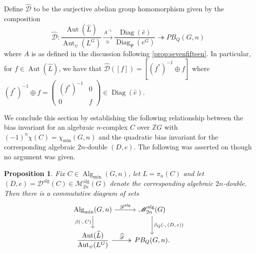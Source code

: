 \documentclass[11pt,a4paper,leqno]{amsart}
\newtheorem{proposition}[theorem]{Proposition}
\theoremstyle{definition}
\theoremstyle{remark}
\newcommand{\wh}{\widehat}
\newcommand{\Z}{\mathbb{Z}}
\DeclareMathOperator{\Aut}{Aut}
\DeclareMathOperator{\DiagIsom}{Diag}
\DeclareMathOperator{\Alg}{Alg}
\DeclareMathOperator{\alg}{alg}
\renewcommand{\L}{L}
\newcommand{\Malg}{\mathscr{M}^{\alg}}
\newcommand{\dalg}{\mathscr{D}^{\alg}}
\begin{document}
Define $\wh{\mathscr{D}}$ to be the surjective abelian group homomorphism given by the composition
\[ \wh{\mathscr{D}} \colon \frac{\Aut(\wh \L)}{\Aut_{\psi}(\L^G)} \xrightarrow[\cong]{A^{-1}} \frac{\DiagIsom(\wh e)}{\DiagIsom_{\Psi}(e^G)}   \twoheadrightarrow PB_Q(G,n) \]	
where $A$ is as defined in the discussion following \cref{prop:sevenfifteen}.
In particular, for $f \in \Aut(\wh L)$, we have that $\wh{\mathscr{D}}([f]) = [(f^*)^{-1} \oplus f]$ where $(f^*)^{-1} \oplus f = \left(\begin{smallmatrix} (f^*)^{-1} & 0 \\ 0 & f \end{smallmatrix}\right) \in \DiagIsom(\wh e)$.

We conclude this section by establishing the following relationship between the bias invariant for an algebraic $n$-complex $C$ over $\Z G$ with $(-1)^n\chi(C) = \chi_{\min}(G,n)$ and the quadratic bias invariant for the corresponding algebraic $2n$-double $(D,e)$.
The following was asserted on \cite[p34]{Kreck:1984} though no argument was given.

\begin{proposition}
\label{prop:bias-vs-qbias}	
Fix $C \in \Alg_{\min}(G,n)$, let $L = \pi_n(C)$ and let $(D,e) = \dalg(C) \in \Malg_{2n}(G)$ denote the corresponding algebraic $2n$-double. Then there is a commutative diagram of sets
\[
\begin{tikzcd}
\Alg_{\min}(G,n) \ar[r,"\mathscr{D}^{\alg}"] \ar[d,"\text{$\beta(\cdot,C)$}"'] & \Malg_{2n}(G)
 \ar[d,"\text{$\beta_Q(\cdot, (D,e))$}"] \\
\displaystyle \frac{\Aut(\wh \L)}{\Aut_{\psi}(\L^G)} \ar[r,twoheadrightarrow,"\text{$\wh{\mathscr{D}}$}"] & \displaystyle PB_Q(G,n).
\end{tikzcd}
\]	
\end{proposition}
\end{document}
